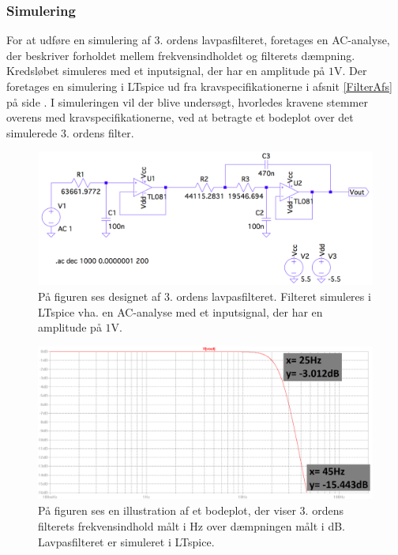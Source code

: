 \subsubsection{Simulering}
For at udføre en simulering af 3. ordens lavpasfilteret, foretages en AC-analyse, der beskriver forholdet mellem frekvensindholdet og filterets dæmpning. Kredsløbet simuleres med et inputsignal, der har en amplitude på $1$V. Der foretages en simulering i LTspice ud fra kravspecifikationerne i afsnit \ref{FilterAfs} på side \pageref{FilterAfs}. I simuleringen vil der blive undersøgt, hvorledes kravene stemmer overens med kravspecifikationerne, ved at betragte et bodeplot over det simulerede 3. ordens filter.
\begin{figure}[H]
	\centering
	\includegraphics[scale=0.35]{figures/cProblemloesning/Lavpasfilter_LTspice.PNG}
	\caption{På figuren ses designet af 3. ordens lavpasfilteret. Filteret simuleres i LTspice vha. en AC-analyse med et inputsignal, der har en amplitude på $1$V.}
	\label{fig:lavpasfilter_LTspice}
\end{figure}
\begin{figure}[H]
	\centering
	\includegraphics[scale=0.38]{figures/cProblemloesning/Lavpasfiltergraf_LTspice2.PNG}
	\caption{På figuren ses en illustration af et bodeplot, der viser 3. ordens filterets frekvensindhold målt i Hz over dæmpningen målt i dB. Lavpasfilteret er simuleret i LTspice.}
	\label{fig:lavpasfiltergraf_LTspice1}
\end{figure}
